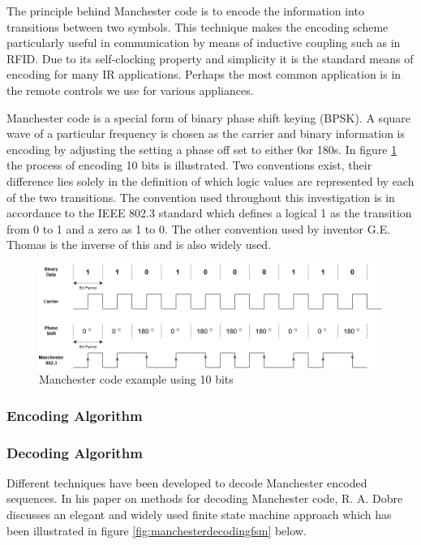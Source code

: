The principle behind Manchester code is to encode the information into transitions between two symbols. This technique makes the encoding scheme particularly useful in communication by means of inductive coupling such as in RFID. Due to its self-clocking property and simplicity it is the standard means of encoding for many IR applications. Perhaps the most common application is in the remote controls we use for various appliances.

Manchester code is a special form of binary phase shift keying (BPSK). A square wave of a particular frequency is chosen as the carrier and binary information is encoding by adjusting the setting a phase off set to either 0\degree or 180\degree s. In figure \ref{fig:manchesterencoding} the process of encoding 10 bits is illustrated. Two conventions exist, their difference lies solely in the definition of which logic values are represented by each of the two transitions. The convention used throughout this investigation is in accordance to the IEEE 802.3 standard which defines a logical 1 as the transition from 0 to 1 and a zero as 1 to 0. The other convention used by inventor G.E. Thomas is the inverse of this and is also widely used.\\

\begin{figure}[H]
	\centering
	\includegraphics[width=0.7\linewidth]{figures/litreview/manchester_encoding}
	\caption{Manchester code example using 10 bits}
	\label{fig:manchesterencoding}
\end{figure}

\subsubsection{Encoding Algorithm}



\subsubsection{Decoding Algorithm}
Different techniques have been developed to decode Manchester encoded sequences. In his paper on methods for decoding Manchester code, R. A. Dobre discusses an elegant and widely used finite state machine approach which has been illustrated in figure \ref{fig:manchesterdecodingfsm} below. \cite{Dobre2014}

